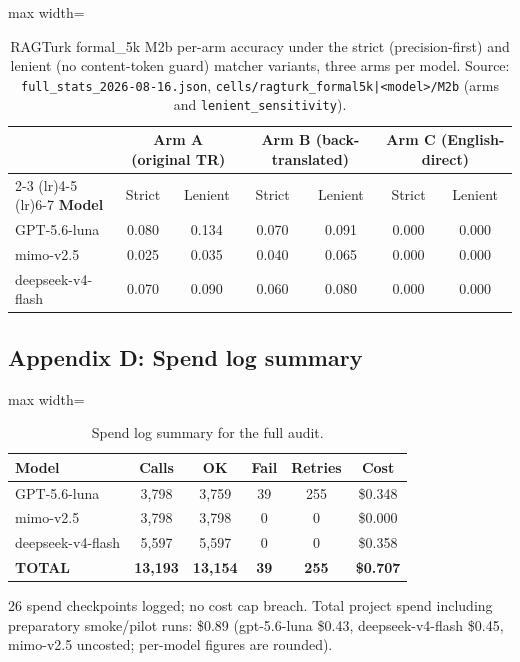 \documentclass[11pt]{article}
\begin{document}
\begin{table}[t]
\centering
\begin{adjustbox}{max width=\textwidth}
\begin{tabular}{lcccccc}
\toprule
& \multicolumn{2}{c}{\textbf{Arm A (original TR)}} & \multicolumn{2}{c}{\textbf{Arm B (back-translated)}} & \multicolumn{2}{c}{\textbf{Arm C (English-direct)}} \\
\cmidrule(lr){2-3} \cmidrule(lr){4-5} \cmidrule(lr){6-7}
\textbf{Model} & Strict & Lenient & Strict & Lenient & Strict & Lenient \\
\midrule
GPT-5.6-luna & 0.080 & 0.134 & 0.070 & 0.091 & 0.000 & 0.000 \\
mimo-v2.5 & 0.025 & 0.035 & 0.040 & 0.065 & 0.000 & 0.000 \\
deepseek-v4-flash & 0.070 & 0.090 & 0.060 & 0.080 & 0.000 & 0.000 \\
\bottomrule
\end{tabular}%
\end{adjustbox}
\caption{RAGTurk formal\_5k M2b per-arm accuracy under the strict (precision-first) and lenient (no content-token guard) matcher variants, three arms per model. Source: \texttt{full\_stats\_2026-08-16.json}, \texttt{cells/ragturk\_formal5k|<model>/M2b} (arms and \texttt{lenient\_sensitivity}).}
\label{tab:lenient}
\end{table}

\subsection*{Appendix D: Spend log summary}

\begin{table}[t]
\centering
\begin{adjustbox}{max width=\textwidth}
\begin{tabular}{lccccc}
\toprule
\textbf{Model} & \textbf{Calls} & \textbf{OK} & \textbf{Fail} & \textbf{Retries} & \textbf{Cost} \\
\midrule
GPT-5.6-luna & 3,798 & 3,759 & 39 & 255 & \$0.348 \\
mimo-v2.5 & 3,798 & 3,798 & 0 & 0 & \$0.000 \\
deepseek-v4-flash & 5,597 & 5,597 & 0 & 0 & \$0.358 \\
\midrule
\textbf{TOTAL} & \textbf{13,193} & \textbf{13,154} & \textbf{39} & \textbf{255} & \textbf{\$0.707} \\
\bottomrule
\end{tabular}%
\end{adjustbox}
\caption{Spend log summary for the full audit.}
\label{tab:spend}
\end{table}

26 spend checkpoints logged; no cost cap breach. Total project spend including preparatory smoke/pilot runs: \$0.89 (gpt-5.6-luna \$0.43, deepseek-v4-flash \$0.45, mimo-v2.5 uncosted; per-model figures are rounded).

\clearpage



\end{document}
